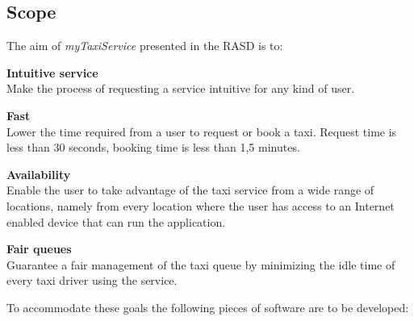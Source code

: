 \newpage

\subsection{Scope}
\label{sub:scope}
The aim of \emph{myTaxiService} presented in the RASD is to:
\begin{enumerate} [label = \textbf{[G\arabic*]}]
\item \textbf{Intuitive service}\hfill \\
\label{goal:intuitive}
Make the process of requesting a service intuitive for any kind of user.
\item \textbf{Fast}\hfill \\
\label{goal:time}
Lower the time required from a user to request or book a taxi. Request time is less than 30 seconds, booking time is less than 1,5 minutes.
\item \textbf{Availability}\hfill \\
\label{goal:availability}
Enable the user to take advantage of the taxi service from a wide range of locations, namely from every location where the user has access to an Internet enabled device that can run the application.
\item \textbf{Fair queues}\hfill \\
\label{goal:queue}
Guarantee a fair management of the taxi queue by minimizing the idle time of every taxi driver using the service.
\end{enumerate}
To accommodate these goals the following pieces of software are to be developed:


